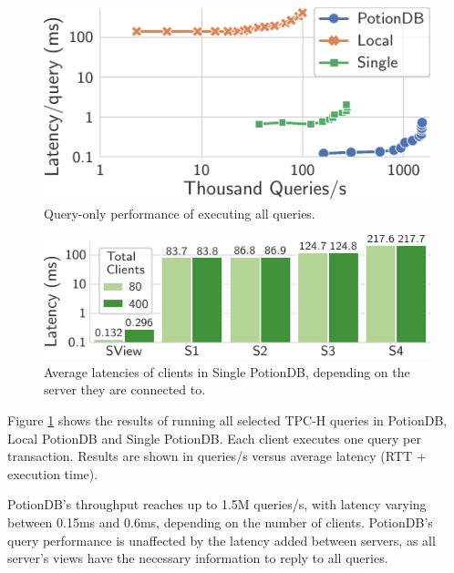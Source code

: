 \documentclass[sigplan,review,anonymous]{acmart}
\begin{document}
\begin{figure}
	\centering
	\includegraphics[width=0.6\linewidth]{singleQuery/all_queries_tc}
	\vspace*{-0.75em}
	\caption{Query-only performance of executing all queries.}
	\label{fig:global_local_single_tc}
	\vspace*{-0.9em}
\end{figure}%
\begin{figure}
	\centering
	\includegraphics[width=0.72\linewidth]{singleQuery/single_TC_latencies}
	\vspace*{-0.6em}
	\caption{Average latencies of clients in Single PotionDB, depending on the server they are connected to.}
	\label{fig:single_tc_latencies}
	\vspace*{-0.9em}
\end{figure}%

Figure \ref{fig:global_local_single_tc} shows the results of running all selected TPC-H queries in PotionDB, Local PotionDB and Single PotionDB.
Each client executes one query per transaction.
Results are shown in queries/s versus average latency (RTT + execution time).

PotionDB's throughput reaches up to 1.5M queries/s, with latency varying between 0.15ms and 0.6ms, depending on the number of clients.
PotionDB's query performance is unaffected by the latency added between servers, as all server's views have the necessary information to reply to all queries.
\end{document}
